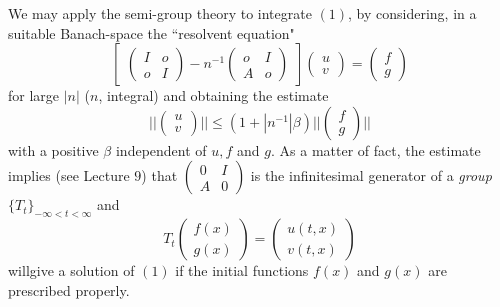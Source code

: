We may apply the semi-group theory to integrate $(1)$, by considering,
in a suitable Banach-space the ``resolvent equation" 
$$
\begin{bmatrix}
 \begin{pmatrix}
  I & o \\ o & I
 \end{pmatrix}
 -n^{-1}
 \begin{pmatrix}
  o & I \\ A & o
 \end{pmatrix}
\end{bmatrix}
\begin{pmatrix}
 u \\ v
\end{pmatrix}
=
\begin{pmatrix}
 f \\ g
\end{pmatrix}
$$
 for large $|n|$ ($n$, integral) and obtaining the estimate
 $$ 
 || 
 \begin{pmatrix} 
  u \\ 
  v 
 \end{pmatrix}
 || \leq (1+ |n^{-1}|
 \beta) || 
 \begin{pmatrix} 
  f \\ 
  g 
 \end{pmatrix} || 
 $$
 with a positive $\beta$ independent of $u, f$ and $g$. As a matter
 of fact, the estimate implies (see Lecture $9$) that
 $\begin{pmatrix} 0 & I \\ A & 0 \end{pmatrix}$ is the infinitesimal
 generator of a \textit {group} $\{T_t \}_{-\infty < t < \infty}$ and 
 $$
 T_t 
 \begin{pmatrix} 
  f (x) \\ 
  g(x) 
 \end{pmatrix} 
 = 
 \begin{pmatrix} 
  u (t, x) \\ 
  v (t, x)
 \end{pmatrix} 
 $$
 will\pageoriginale give a solution of $(1)$ if the initial functions $f(x)$ and
 $g(x)$ are prescribed properly. 
 

